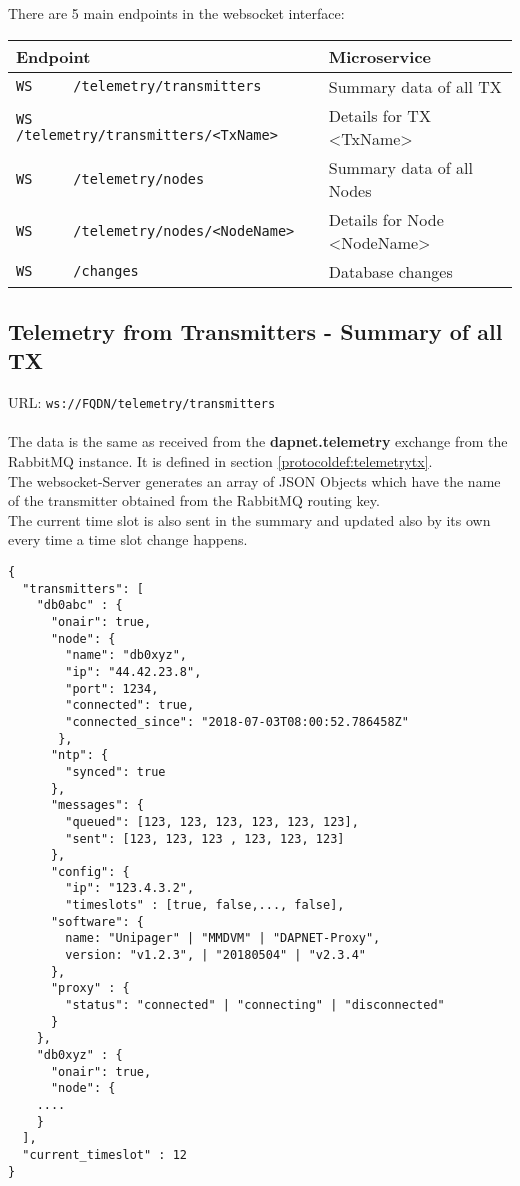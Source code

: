 
There are 5 main endpoints in the websocket interface:


\begin{center}
  \begin{tabular}{|l|l|} \hline
    Endpoint & Microservice \\ \hline \hline
    \verb|WS     /telemetry/transmitters| & Summary data of all TX \\ \hline
    \verb|WS     /telemetry/transmitters/<TxName>| & Details for TX <TxName>\\ \hline
    \verb|WS     /telemetry/nodes| & Summary data of all Nodes\\ \hline
    \verb|WS     /telemetry/nodes/<NodeName>| & Details for Node <NodeName>\\ \hline
    \verb|WS     /changes| & Database changes\\ \hline

  \end{tabular}
\end{center}


\subsection{Telemetry from Transmitters - Summary of all TX}
\label{protcoldef:websocketapi:telemetrytxsummary}
URL: \texttt{ws://FQDN/telemetry/transmitters}\\\\

The data is the same as received from the \textbf{dapnet.telemetry} exchange
from the RabbitMQ instance. It is defined in section
\ref{protocoldef:telemetrytx}.\\
The websocket-Server generates an array of JSON Objects which have the name of the transmitter obtained from the RabbitMQ routing key.\\
The current time slot is also sent in the summary and updated also by its own every time a time slot change happens.

\begin{lstlisting}
{
  "transmitters": [
    "db0abc" : {
      "onair": true,
      "node": {
        "name": "db0xyz",
        "ip": "44.42.23.8",
        "port": 1234,
        "connected": true,
        "connected_since": "2018-07-03T08:00:52.786458Z"
       },
      "ntp": {
        "synced": true
      },
      "messages": {
        "queued": [123, 123, 123, 123, 123, 123],
        "sent": [123, 123, 123 , 123, 123, 123]
      },
      "config": {
        "ip": "123.4.3.2",
        "timeslots" : [true, false,...,	false],
      "software": {
        name: "Unipager" | "MMDVM" | "DAPNET-Proxy",
        version: "v1.2.3", | "20180504" | "v2.3.4"
      },
      "proxy" : {
        "status": "connected" | "connecting" | "disconnected"
      }
    },
    "db0xyz" : {
      "onair": true,
      "node": {
    ....
    }        
  ],
  "current_timeslot" : 12
}
\end{lstlisting}

